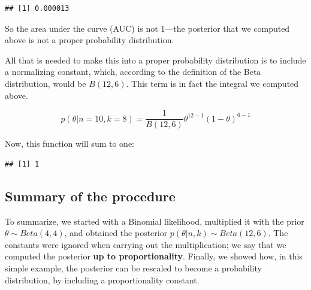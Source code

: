 \documentclass[12pt,]{krantz}
\newenvironment{Shaded}{\begin{snugshade}}{\end{snugshade}}
\newcommand{\ControlFlowTok}[1]{\textcolor[rgb]{0.13,0.29,0.53}{\textbf{#1}}}
\newcommand{\DataTypeTok}[1]{\textcolor[rgb]{0.13,0.29,0.53}{#1}}
\newcommand{\DecValTok}[1]{\textcolor[rgb]{0.00,0.00,0.81}{#1}}
\newcommand{\KeywordTok}[1]{\textcolor[rgb]{0.13,0.29,0.53}{\textbf{#1}}}
\newcommand{\NormalTok}[1]{#1}
\newcommand{\OperatorTok}[1]{\textcolor[rgb]{0.81,0.36,0.00}{\textbf{#1}}}
\newcommand{\StringTok}[1]{\textcolor[rgb]{0.31,0.60,0.02}{#1}}
\theoremstyle{definition}
\theoremstyle{definition}
\theoremstyle{definition}
\theoremstyle{remark}
\begin{document}
\begin{verbatim}
## [1] 0.000013
\end{verbatim}

So the area under the curve (AUC) is not 1---the posterior that we computed above is not a proper probability distribution.

All that is needed to make this into a proper probability distribution is to include a normalizing constant, which, according to the definition of the Beta distribution, would be \(B(12,6)\). This term is in fact the integral we computed above.

\begin{equation}
p(\theta|n=10,k=8) = \frac{1}{B(12,6)} \theta^{12-1} (1-\theta)^{6-1} 
\end{equation}

Now, this function will sum to one:

\begin{Shaded}
\end{Shaded}

\begin{verbatim}
## [1] 1
\end{verbatim}

\hypertarget{summary-of-the-procedure}{%
\subsection{Summary of the procedure}\label{summary-of-the-procedure}}

To summarize, we started with a Binomial likelihood, multiplied it with the prior \(\theta \sim Beta(4,4)\), and obtained the posterior \(p(\theta|n,k) \sim Beta(12,6)\). The constants were ignored when carrying out the multiplication; we say that we computed the posterior \textbf{up to proportionality}. Finally, we showed how, in this simple example, the posterior can be rescaled to become a probability distribution, by including a proportionality constant.
\end{document}
